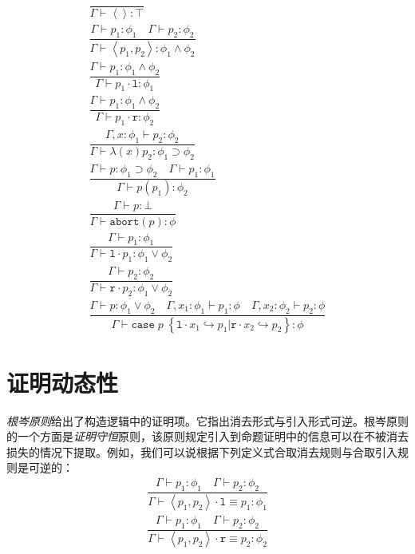 \begin{subequations}
    \begin{gather}
       \dfrac{}{\Gamma \vdash \left \langle\right \rangle : \top} \\
       \dfrac{\Gamma \vdash p_1 : \phi_1\quad\Gamma \vdash p_2:\phi_2}{\Gamma \vdash \left \langle p_1,p_2 \right \rangle : \phi_1 \land \phi_2} \\
       \dfrac{\Gamma \vdash p_1 : \phi_1 \land \phi_2}{ \Gamma \vdash p_1 \cdot \mathtt{l} : \phi_1} \\
       \dfrac{\Gamma \vdash p_1 : \phi_1 \land \phi_2}{ \Gamma \vdash p_1 \cdot \mathtt{r} : \phi_2} \\
       \dfrac{\Gamma,x : \phi_1 \vdash p_2 : \phi_2}{ \Gamma \vdash \lambda\left(x\right)p_2 : \phi_1 \supset \phi_2} \\
       \dfrac{ \Gamma \vdash p : \phi_1 \supset \phi_2\quad\Gamma \vdash p_1 : \phi_1}{\Gamma \vdash p(p_1) : \phi_2} \\
       \dfrac{\Gamma \vdash p : \bot}{\Gamma \vdash \mathtt{abort}\left(p\right) : \phi} \\
       \dfrac{\Gamma \vdash p_1 : \phi_1}{ \Gamma \vdash \mathtt{l} \cdot p_1 : \phi_1 \lor \phi_2} \\
       \dfrac{\Gamma \vdash p_2 : \phi_2}{ \Gamma \vdash \mathtt{r} \cdot p_2 : \phi_1 \lor \phi_2} \\
       \dfrac{\Gamma \vdash p : \phi_1 \lor \phi_2\quad\Gamma,x_1 : \phi_1 \vdash p_1 : \phi\quad\Gamma,x_2 : \phi_2 \vdash p_2 : \phi}
             { \Gamma \vdash \mathtt{case}\; p\; \left\{\mathtt{l} \cdot x_1\hookrightarrow p_1 |\mathtt{r} \cdot x_2\hookrightarrow p_2\right\} : \phi}
    \end{gather}
\end{subequations}


\section{证明动态性}
\textit{根岑原则}给出了构造逻辑中的证明项。它指出消去形式与引入形式可逆。根岑原则的一个方面是\textit{证明守恒}原则，该原则规定引入到命题证明中的信息可以在不被消去损失的情况下提取。例如，我们可以说根据下列定义式合取消去规则与合取引入规则是可逆的：
\begin{subequations}
    \begin{gather}
       \dfrac{\Gamma \vdash p_1 : \phi_1\quad\Gamma \vdash p_2:\phi_2}
             {\Gamma \vdash \left \langle p_1,p_2  \right \rangle \cdot \mathtt{l} \equiv p_1: \phi_1} \\
       \dfrac{\Gamma \vdash p_1 : \phi_1\quad\Gamma \vdash p_2:\phi_2}
             {\Gamma \vdash \left \langle p_1,p_2  \right \rangle \cdot \mathtt{r} \equiv p_2 : \phi_2}
    \end{gather}
\end{subequations}

